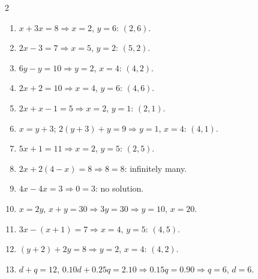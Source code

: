 \documentclass[11pt]{article}
\begin{document}
\begin{keybox}
\begin{multicols}{2}
\small
\begin{enumerate}[leftmargin=*,itemsep=3pt]
  \item $x+3x=8\Rightarrow x=2$, $y=6$: $(2,6)$.
  \item $2x-3=7\Rightarrow x=5$, $y=2$: $(5,2)$.
  \item $6y-y=10\Rightarrow y=2$, $x=4$: $(4,2)$.
  \item $2x+2=10\Rightarrow x=4$, $y=6$: $(4,6)$.
  \item $2x+x-1=5\Rightarrow x=2$, $y=1$: $(2,1)$.
  \item $x=y+3$; $2(y+3)+y=9\Rightarrow y=1$, $x=4$: $(4,1)$.
  \item $5x+1=11\Rightarrow x=2$, $y=5$: $(2,5)$.
  \item $2x+2(4-x)=8\Rightarrow 8=8$: infinitely many.
  \item $4x-4x=3\Rightarrow 0=3$: no solution.
  \item $x=2y$, $x+y=30\Rightarrow 3y=30\Rightarrow y=10$, $x=20$.
  \item $3x-(x+1)=7\Rightarrow x=4$, $y=5$: $(4,5)$.
  \item $(y+2)+2y=8\Rightarrow y=2$, $x=4$: $(4,2)$.
  \item $d+q=12$, $0.10d+0.25q=2.10\Rightarrow 0.15q=0.90\Rightarrow q=6$, $d=6$.
\end{enumerate}
\end{multicols}
\end{keybox}
\end{document}
